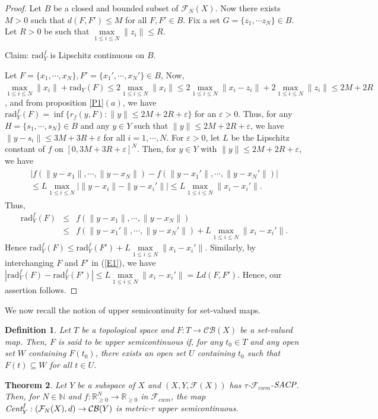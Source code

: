 \documentclass[11pt]{amsart}
\newtheorem{thm}{Theorem}[section]
\newtheorem{Def}[thm]{Definition}
\newcommand{\bdfn}{\begin{Def} \rm}
\newcommand{\edfn}{\end{Def}}
\newcommand{\ra}{\rightarrow}
\newcommand{\ci}{\subseteq}
\newcommand{\e}{\varepsilon}
\newcommand{\mb}{\mathbb}
\newcommand{\mc}{\mathcal}
\newcommand{\mr}{\mathscr}
\newcommand{\trr}{\textrm{rad}}
\newcommand{\emC}{\emph{Cent}}
\newcommand{\eSACP}{\bf{\emph{SACP}}}
\newcommand{\beqa}{\begin{eqnarray*}}
\newcommand{\eeqa}{\end{eqnarray*}}
\begin{document}
\begin{proof}
Let $B$ be a closed and bounded subset of $\mc{F}_N(X)$. Now there exists  $M>0$  such that $d(F,F')\leq M$ for all $F,F'\in B$. Fix a set $G=\{z_1,\cdots z_N\}\in B$. Let $R>0$ be such that $\underset{1\leq i\leq N}{\max}\|z_i\|\leq R$.

{\sc Claim:} $\trr_Y^f$ is Lipschitz continuous on $B$.

Let $F=\{x_1,\cdots,x_N\}, F'=\{x_1',\cdots,x_N'\}\in B$,
Now, $\underset{1\leq i\leq N}{\max}\|x_i\|+\trr_Y(F)\leq 2\underset{1\leq i\leq N}{\max}\|x_i\|\leq 2\underset{1\leq i\leq N}{\max}\|x_i-z_i\|+2\underset{1\leq i\leq N}{\max}\|z_i\|\leq 2M+2R$, and from proposition \ref{P1}$(a)$, we have $\trr_Y^f(F)=\inf\{r_f(y,F):\|y\|\leq 2M+2R+\e\}$ for an $\e>0$. Thus, for any $H=\{s_1,\cdots,s_N\}\in B$ and any $y\in Y$ such that $\|y\|\leq 2M+2R+\e$, we have $\|y-s_i\|\leq 3M+3R+\e$ for all $i=1,\cdots,N$. For $\e>0$, let $L$ be the Lipschitz constant of $f$ on $[0,3M+3R+\e]^N$. Then, for  $y\in Y$ with $\|y\|\leq 2M+2R+\e$, we have
\begin{eqnarray}\label{E1}
\begin{split}
|f(\|y-x_1\|,\cdots,\|y-x_N\|)-f(\|y-x_1'\|,\cdots,\|y-x_N'\|)|\\
\leq L\underset{1\leq i\leq N}{\max}|\|y-x_i\|-\|y-x_i'\||
\leq L\underset{1\leq i\leq N}{\max}\|x_i-x_i'\|.
\end{split}
\end{eqnarray}
Thus,
\beqa
\trr_Y^f(F)&\leq& f(\|y-x_1\|,\cdots,\|y-x_N\|)\\
&\leq&f(\|y-x_1'\|,\cdots,\|y-x_N'\|)+L\underset{1\leq i\leq N}{\max}\|x_i-x_i'\|.
\eeqa
Hence $\trr_Y^f(F)\leq\trr_Y^f(F')+L\underset{1\leq i\leq N}{\max}\|x_i-x_i'\|$. Similarly, by interchanging $F$ and $F'$ in (\ref{E1}), we have $|\trr_Y^f(F)-\trr_Y^f(F')|\leq L\underset{1\leq i\leq N}{\max}\|x_i-x_i'\|=Ld(F,F')$. Hence, our assertion follows.
\end{proof}
We now recall the notion of upper semicontinuity for set-valued maps.
\bdfn
Let $T$ be a topological space and $F:T\ra \mc{CB}(X)$ be a set-valued map. Then, $F$ is said to be {\it upper semicontinuous} if, for any $t_0\in T$ and any open set $W$ containing $F(t_0)$, there exists an open set $U$ containing $t_0$ such that $F(t)\ci W$ for all $t\in U$.
\edfn
\begin{thm}
Let $Y$ be a subspace of $X$ and $(X,Y,\mc{F}(X))$ has $\tau$-$\mr{F}_{cwm}$-$\eSACP$. Then, for $N\in\mb{N}$ and $f:\mb{R}^N_{\geq0}\ra\mb{R}_{\geq0}$ in $\mr{F}_{cwm}$, the map $\emC_Y^f:(\mc{F}_N(X),d)\ra\mc{CB}(Y)$ is metric-$\tau$ upper semicontinuous. 
\end{thm}
\end{document}
